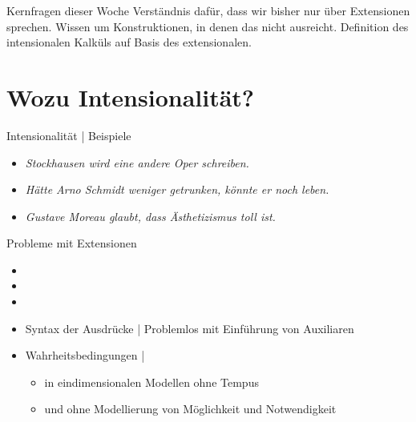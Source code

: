 \begin{frame}
  {Kernfragen dieser Woche}
  \onslide<+->
  \onslide<+->
  \Large
  \centering 
  Verständnis dafür, dass wir bisher nur über \alert{Extensionen} sprechen.
  \Halbzeile
  \onslide<+->
  Wissen um Konstruktionen, in denen das nicht ausreicht.
  \Halbzeile
  \onslide<+->
  Definition des intensionalen Kalküls auf Basis des extensionalen.
\end{frame}

\section{Wozu Intensionalität?}

\begin{frame}
  {Intensionalität | Beispiele}
  \onslide<+->
  \begin{itemize}[<+->]
    \item \textit{Stockhausen \alert{wird} eine andere Oper schreiben.}
    \item \textit{\alert{Hätte} Arno Schmidt weniger getrunken, \alert{könnte} er noch leben.}
    \item \textit{Gustave Moreau \alert{glaubt}, dass Ästhetizismus toll ist.}
  \end{itemize}
\end{frame}

\begin{frame}
  {Probleme mit Extensionen}
  \onslide<+->
  \onslide<+->
  \begin{itemize}
    \item {}
    \item {}
    \item {}
  \end{itemize}
  \Halbzeile
  \begin{itemize}[<+->]
    \item \alert{Syntax} der Ausdrücke | Problemlos mit Einführung von Auxiliaren
    \item \alert{Wahrheitsbedingungen} | 
      \begin{itemize}[<+->]
        \item in eindimensionalen Modellen ohne Tempus 
        \item und ohne Modellierung von Möglichkeit und Notwendigkeit\\
      \end{itemize}
  \end{itemize}
\end{frame}


